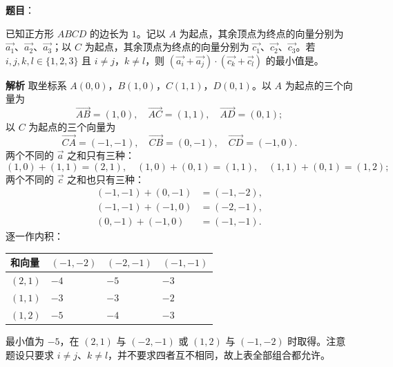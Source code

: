 \begin{answer}

\textbf{题目}：

已知正方形 $ABCD$ 的边长为 $1$。记以 $A$ 为起点，其余顶点为终点的向量分别为 $\overrightarrow{a_1}$、$\overrightarrow{a_2}$、$\overrightarrow{a_3}$；以 $C$ 为起点，其余顶点为终点的向量分别为 $\overrightarrow{c_1}$、$\overrightarrow{c_2}$、$\overrightarrow{c_3}$。若 $i,j,k,l\in\{1,2,3\}$ 且 $i\neq j$，$k\neq l$，则 $(\overrightarrow{a_i}+\overrightarrow{a_j})\cdot(\overrightarrow{c_k}+\overrightarrow{c_l})$ 的最小值是\gkblank{}。

\textbf{解析}
取坐标系 $A(0,0)$，$B(1,0)$，$C(1,1)$，$D(0,1)$。以 $A$ 为起点的三个向量为
\nopagebreak[4]
\[\overrightarrow{AB}=(1,0),\quad\overrightarrow{AC}=(1,1),\quad\overrightarrow{AD}=(0,1);\]
以 $C$ 为起点的三个向量为
\nopagebreak[4]
\[\overrightarrow{CA}=(-1,-1),\quad\overrightarrow{CB}=(0,-1),\quad\overrightarrow{CD}=(-1,0).\]
两个不同的 $\overrightarrow{a}$ 之和只有三种：
\nopagebreak[4]
\[(1,0)+(1,1)=(2,1),\quad(1,0)+(0,1)=(1,1),\quad(1,1)+(0,1)=(1,2);\]
两个不同的 $\overrightarrow{c}$ 之和也只有三种：
\nopagebreak[4]
\[\begin{aligned}
(-1,-1)+(0,-1)&=(-1,-2),\\
(-1,-1)+(-1,0)&=(-2,-1),\\
(0,-1)+(-1,0)&=(-1,-1).
\end{aligned}\]
逐一作内积：

\begin{center}
\begin{tabular}{llll}
\toprule
和向量 & $(-1,-2)$ & $(-2,-1)$ & $(-1,-1)$ \\
\midrule
$(2,1)$ & $-4$ & $-5$ & $-3$ \\
$(1,1)$ & $-3$ & $-3$ & $-2$ \\
$(1,2)$ & $-5$ & $-4$ & $-3$ \\
\bottomrule
\end{tabular}
\end{center}

最小值为 $-5$，在 $(2,1)$ 与 $(-2,-1)$ 或 $(1,2)$ 与 $(-1,-2)$ 时取得。注意题设只要求 $i\neq j$、$k\neq l$，并不要求四者互不相同，故上表全部组合都允许。


\end{answer}
